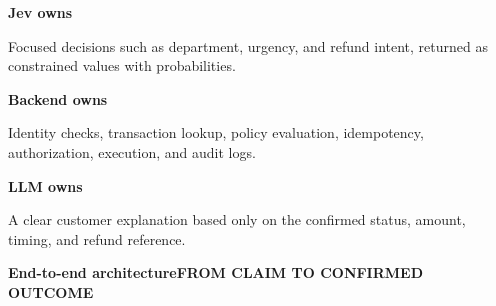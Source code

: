 \documentclass[10pt,a4paper,landscape]{article}
\newcommand{\pageheading}[2]{%
  {\Large\bfseries\color{Navy}#1}\hfill{\small\bfseries\color{Teal}#2}\par
  \vspace{1mm}{\color{Line}\rule{\textwidth}{0.7pt}}\vspace{3mm}
}
\begin{document}
\vfill
\begin{minipage}[t]{0.32\textwidth}
\begin{tcolorbox}[border,colback=PaleTeal]
\textbf{Jev owns}\par
Focused decisions such as department, urgency, and refund intent, returned as constrained values with probabilities.
\end{tcolorbox}
\end{minipage}\hfill
\begin{minipage}[t]{0.32\textwidth}
\begin{tcolorbox}[border,colback=PaleGreen]
\textbf{Backend owns}\par
Identity checks, transaction lookup, policy evaluation, idempotency, authorization, execution, and audit logs.
\end{tcolorbox}
\end{minipage}\hfill
\begin{minipage}[t]{0.32\textwidth}
\begin{tcolorbox}[border,colback=PaleBlue]
\textbf{LLM owns}\par
A clear customer explanation based only on the confirmed status, amount, timing, and refund reference.
\end{tcolorbox}
\end{minipage}

\newpage

\pageheading{End-to-end architecture}{FROM CLAIM TO CONFIRMED OUTCOME}
\end{document}
